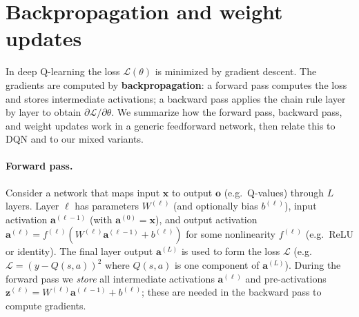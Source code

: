\documentclass[11pt]{article}
\begin{document}
\section{Backpropagation and weight updates}

In deep Q-learning the loss $\mathcal{L}(\theta)$ is minimized by gradient descent. The gradients are computed by \textbf{backpropagation}: a forward pass computes the loss and stores intermediate activations; a backward pass applies the chain rule layer by layer to obtain $\partial \mathcal{L} / \partial \theta$. We summarize how the forward pass, backward pass, and weight updates work in a generic feedforward network, then relate this to DQN and to our mixed variants.

\paragraph{Forward pass.} Consider a network that maps input $\mathbf{x}$ to output $\mathbf{o}$ (e.g.\ Q-values) through $L$ layers. Layer $\ell$ has parameters $W^{(\ell)}$ (and optionally bias $b^{(\ell)}$), input activation $\mathbf{a}^{(\ell-1)}$ (with $\mathbf{a}^{(0)} = \mathbf{x}$), and output activation $\mathbf{a}^{(\ell)} = f^{(\ell)}(W^{(\ell)} \mathbf{a}^{(\ell-1)} + b^{(\ell)})$ for some nonlinearity $f^{(\ell)}$ (e.g.\ ReLU or identity). The final layer output $\mathbf{a}^{(L)}$ is used to form the loss $\mathcal{L}$ (e.g.\ $\mathcal{L} = (y - Q(s,a))^2$ where $Q(s,a)$ is one component of $\mathbf{a}^{(L)}$). During the forward pass we \emph{store} all intermediate activations $\mathbf{a}^{(\ell)}$ and pre-activations $\mathbf{z}^{(\ell)} = W^{(\ell)} \mathbf{a}^{(\ell-1)} + b^{(\ell)}$; these are needed in the backward pass to compute gradients.
\end{document}

